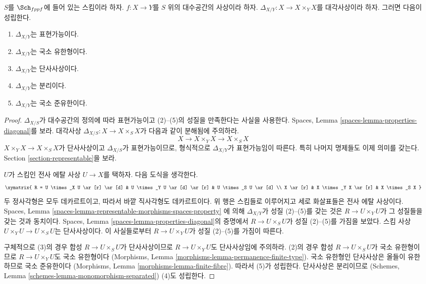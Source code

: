\begin{lemma}
\label{lemma-properties-diagonal}
$S$를 $\Sch_{fppf}$에 들어 있는 스킴이라 하자.
$f : X \to Y$를 $S$ 위의 대수공간의 사상이라 하자.
$\Delta_{X/Y} : X \to X \times_Y X$를 대각사상이라 하자.
그러면 다음이 성립한다.
\begin{enumerate}
\item $\Delta_{X/Y}$는 표현가능이다.
\item $\Delta_{X/Y}$는 국소 유한형이다.
\item $\Delta_{X/Y}$는 단사사상이다.
\item $\Delta_{X/Y}$는 분리이다.
\item $\Delta_{X/Y}$는 국소 준유한이다.
\end{enumerate}
\end{lemma}

\begin{proof}
$\Delta_{X/S}$가 대수공간의 정의에 따라 표현가능이고
(2)--(5)의 성질을 만족한다는 사실을 사용한다. Spaces, Lemma
\ref{spaces-lemma-properties-diagonal}를 보라.
대각사상 $\Delta_{X/S} : X \to X \times_S X$가 다음과 같이
분해됨에 주의하라.
$$
X
\longrightarrow
X \times_Y X
\longrightarrow
X \times_S X
$$
$X \times_Y X \to X \times_S X$가 단사사상이고
$\Delta_{X/S}$가 표현가능이므로, 형식적으로
$\Delta_{X/Y}$가 표현가능임이 따른다. 특히 나머지 명제들도
이제 의미를 갖는다. Section \ref{section-representable}을 보라.

\medskip\noindent
$U$가 스킴인 전사 에탈 사상 $U \to X$를 택하자.
다음 도식을 생각한다.
$$
\xymatrix{
R = U \times_X U \ar[r] \ar[d] &
U \times_Y U \ar[d] \ar[r] &
U \times_S U \ar[d] \\
X \ar[r] & X \times_Y X \ar[r] & X \times_S X
}
$$
두 정사각형은 모두 데카르트이고, 따라서 바깥 직사각형도 데카르트이다.
위 행은 스킴들로 이루어지고 세로 화살표들은 전사 에탈 사상이다.
Spaces, Lemma \ref{spaces-lemma-representable-morphisms-spaces-property}
에 의해 $\Delta_{X/Y}$가 성질 (2)--(5)를 갖는 것은
$R \to U \times_Y U$가 그 성질들을 갖는 것과 동치이다.
Spaces, Lemma \ref{spaces-lemma-properties-diagonal}의 증명에서
$R \to U \times_S U$가 성질 (2)--(5)를 가짐을 보았다.
스킴 사상 $U \times_Y U \to U \times_S U$는 단사사상이다.
이 사실들로부터 $R \to U \times_Y U$가 성질 (2)--(5)를 가짐이 따른다.

\medskip\noindent
구체적으로 (3)의 경우 합성 $R \to U \times_S U$가 단사사상이므로
$R \to U \times_Y U$도 단사사상임에 주의하라.
(2)의 경우 합성 $R \to U \times_S U$가 국소 유한형이므로
$R \to U \times_Y U$도 국소 유한형이다
(Morphisms, Lemma \ref{morphisms-lemma-permanence-finite-type}).
국소 유한형인 단사사상은 올들이 유한하므로 국소 준유한이다
(Morphisms, Lemma \ref{morphisms-lemma-finite-fibre}). 따라서 (5)가
성립한다. 단사사상은 분리이므로
(Schemes, Lemma \ref{schemes-lemma-monomorphism-separated}) (4)도
성립한다.
\end{proof}

